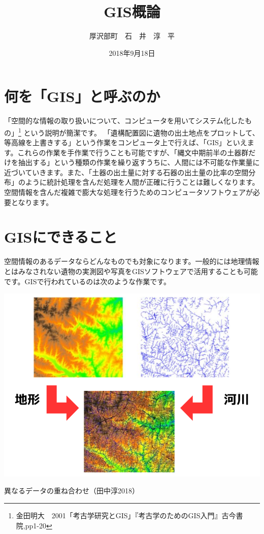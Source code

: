\documentclass[14Q,twocolumn]{jsarticle}
\title{GIS概論}%
\date{2018年9月18日}
\author{厚沢部町　石　井　淳　平}              %
\makeatletter
\newenvironment{figurehere}
  {\def\@captype{figure}}
  {}
\makeatother
\begin{document}
\maketitle
\section{何を「GIS」と呼ぶのか}
「空間的な情報の取り扱いについて、コンピュータを用いてシステム化したもの」\footnote{
金田明大　2001「考古学研究とGIS」『考古学のためのGIS入門』古今書院,pp1-20
}
という説明が簡潔です。
「遺構配置図に遺物の出土地点をプロットして、等高線を上書きする」という作業をコンピュータ上で行えば、「GIS」といえます。これらの作業を手作業で行うことも可能ですが、「縄文中期前半の土器群だけを抽出する」という種類の作業を繰り返すうちに、人間には不可能な作業量に近づいていきます。また、「土器の出土量に対する石器の出土量の比率の空間分布」のように統計処理を含んだ処理を人間が正確に行うことは難しくなります。空間情報を含んだ複雑で膨大な処理を行うためのコンピュータソフトウェアが必要となります。

\section{GISにできること}
空間情報のあるデータならどんなものでも対象になります。一般的には地理情報とはみなされない遺物の実測図や写真をGISソフトウェアで活用することも可能です。GISで行われているのは次のような作業です。

\begin{figurehere}
\centering
\includegraphics[width=1\linewidth]{exp01.png}
\caption{異なるデータの重ね合わせ（田中淳2018）}
\end{figurehere}
\end{document}
